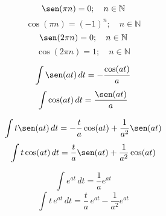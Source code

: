 \begin{equation*}
    \sen(\pi n)=0;\quad n\in\mathbb{N}
\end{equation*}
\begin{equation*}
    \cos(\pi n)={(-1)}^n;\quad n\in\mathbb{N}
\end{equation*}
\begin{equation*}
    \sen(2\pi n)=0;\quad n\in\mathbb{N}
\end{equation*}
\begin{equation*}
    \cos(2\pi n)=1;\quad n\in\mathbb{N}
\end{equation*}

\begin{equation*}
    \int \sen(at)\,dt=-\frac{\cos(at)}{a}
\end{equation*}
\begin{equation*}
    \int \cos(at)\,dt=\frac{\sen(at)}{a}
\end{equation*}

\begin{equation*}
    \int t\sen(at)\,dt=-\frac{t}{a}\cos(at)+\frac{1}{a^2}\sen(at)
\end{equation*}
\begin{equation*}
    \int t\cos(at)\,dt=\frac{t}{a}\sen(at)+\frac{1}{a^2}\cos(at)
\end{equation*}

\begin{equation*}
    \int {e}^{at}\,dt=\frac{1}{a}e^{at}
\end{equation*}
\begin{equation*}
    \int t\,{e}^{at}\,dt=\frac{t}{a}\,{e}^{at}-\frac{1}{a^2}{e}^{at}
\end{equation*}

